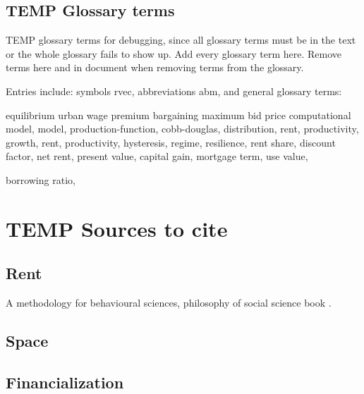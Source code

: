 
\section{TEMP Glossary terms}

TEMP glossary terms for debugging, since all glossary terms must be in the text or the whole glossary fails to show up. Add every glossary term here. Remove terms here and in document when removing terms from the glossary. %

Entries include:  
symbols \gls{rvec}, 
abbreviations \gls{abm}, 
and general glossary terms:



\gls{equilibrium}
\gls{urban wage premium}
\gls{bargaining}
\gls{maximum bid price}
\gls{computational model}, 
\gls{model},  
\gls{production-function}, 
\gls{cobb-douglas}, 
\gls{distribution},
\gls{rent}, 
\gls{productivity}, 
\gls{growth}, 
\gls{rent}, 
\gls{productivity}, 
\gls{hysteresis}, 
\gls{regime}, 
\gls{resilience}, 
\gls{rent share},
\gls{discount factor},
\gls{net rent}, 
\gls{present value}, 
\gls{capital gain},
\gls{mortgage term},
\gls{use value},

\gls{borrowing ratio},

\chapter{TEMP Sources to cite}

\section{Rent}
A methodology for behavioural sciences, philosophy of social science book \cite{kaplanConductInquiryMethodology2017}.


\section{Space}


\section{Financialization}



